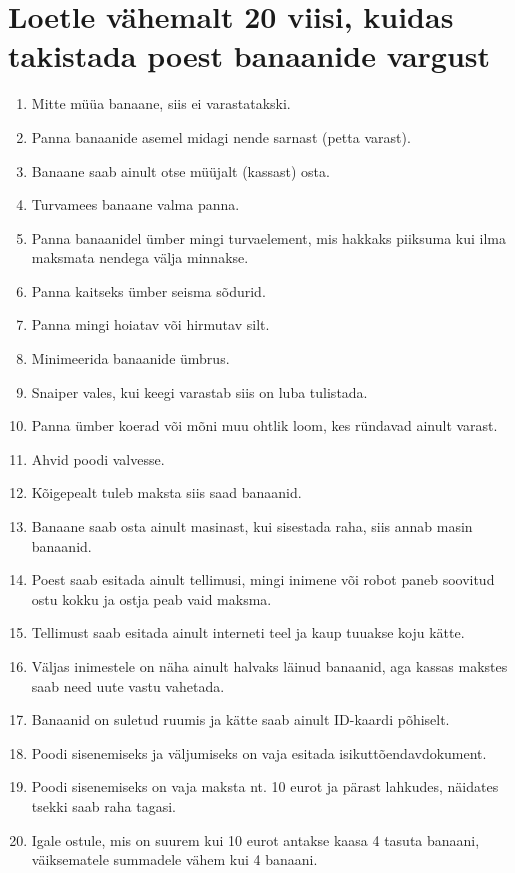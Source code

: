 \documentclass{article}
\begin{document}
\section{Loetle vähemalt 20 viisi, kuidas takistada poest banaanide vargust}
\begin{enumerate}
	\item{Mitte müüa banaane, siis ei varastatakski.}
	\item{Panna banaanide asemel midagi nende sarnast (petta varast).}
	\item{Banaane saab ainult otse müüjalt (kassast) osta.}
	\item{Turvamees banaane valma panna.}
	\item{Panna banaanidel ümber mingi turvaelement, mis hakkaks piiksuma kui ilma maksmata nendega välja minnakse.}
	\item{Panna kaitseks ümber seisma sõdurid.}
	\item{Panna mingi hoiatav või hirmutav silt.}
	\item{Minimeerida banaanide ümbrus.}
	\item{Snaiper vales, kui keegi varastab siis on luba tulistada.}
	\item{Panna ümber koerad või mõni muu ohtlik loom, kes ründavad ainult varast.}
	\item{Ahvid poodi valvesse.}
	\item{Kõigepealt tuleb maksta siis saad banaanid.}
	\item{Banaane saab osta ainult masinast, kui sisestada raha, siis annab masin banaanid.}
	\item{Poest saab esitada ainult tellimusi, mingi inimene või robot paneb soovitud ostu kokku ja ostja peab vaid maksma.}
	\item{Tellimust saab esitada ainult interneti teel ja kaup tuuakse koju kätte.}
	\item{Väljas inimestele on näha ainult halvaks läinud banaanid, aga kassas makstes saab need uute vastu vahetada.}
	\item{Banaanid on suletud ruumis ja kätte saab ainult ID-kaardi põhiselt.}
	\item{Poodi sisenemiseks ja väljumiseks on vaja esitada isikuttõendavdokument.}
	\item{Poodi sisenemiseks on vaja maksta nt. 10 eurot ja pärast lahkudes, näidates tsekki saab raha tagasi.}
	\item{Igale ostule, mis on suurem kui 10 eurot antakse kaasa 4 tasuta banaani, väiksematele summadele vähem kui 4 banaani.}
\end{enumerate}
\end{document}
